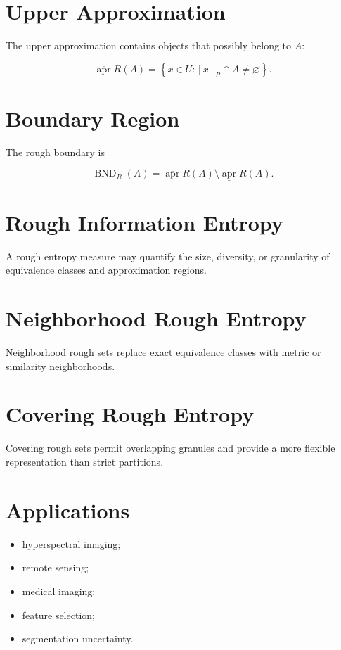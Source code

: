 \documentclass[11pt,oneside]{book}
\theoremstyle{remark}
\newcommand{\Lower}{\underline{\operatorname{apr}}}
\newcommand{\Upper}{\overline{\operatorname{apr}}}
\newcommand{\Boundary}{\operatorname{BND}}
\newenvironment{applicationlist}
{
	\begin{itemize}[label=\(\blacktriangleright\)]
	}
	{
	\end{itemize}
}
\begin{document}
	\section{Upper Approximation}
	
	The upper approximation contains objects that possibly belong to \(A\):
	
	\[
	\Upper{R}(A)
	=
	\left\{
	x\in U:
	[x]_R\cap A\neq\varnothing
	\right\}.
	\]
	
	\section{Boundary Region}
	
	The rough boundary is
	
	\[
	\Boundary_R(A)
	=
	\Upper{R}(A)
	\setminus
	\Lower{R}(A).
	\]
	
	\section{Rough Information Entropy}
	
	A rough entropy measure may quantify the size, diversity, or granularity of
	equivalence classes and approximation regions.
	
	\section{Neighborhood Rough Entropy}
	
	Neighborhood rough sets replace exact equivalence classes with metric or
	similarity neighborhoods.
	
	\section{Covering Rough Entropy}
	
	Covering rough sets permit overlapping granules and provide a more flexible
	representation than strict partitions.
	
	\section*{Applications}
	
	\begin{applicationlist}
		\item hyperspectral imaging;
		\item remote sensing;
		\item medical imaging;
		\item feature selection;
		\item segmentation uncertainty.
	\end{applicationlist}
	
\end{document}

